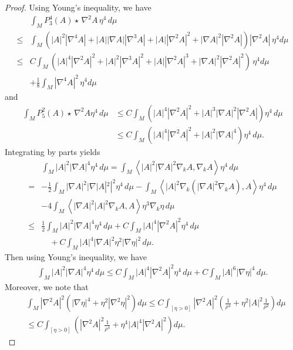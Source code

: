 \documentclass{amsart}
\theoremstyle{definition}
\numberwithin{equation}{section}
\begin{document}
\begin{proof}
Using Young's inequality, we have
\begin{align}\label{4.5.5}
  &\int_{M}     P_{3}^{4}(A)\star \,  \nabla^{2} A\, \eta ^{4}\, d\mu \\
   \leq &\int_{M} (|A|^2|\nabla^4 A| +|A| |\nabla A| |\nabla^3 A|  +|A||\nabla^2A|^2+|\nabla A|^2|\nabla^2A|)|\nabla^2A| \,\eta
   ^{4}d\mu\nonumber\\
  \leq & C \int_{M}(|A|^4|\nabla^2A|^2+|A|^2|\nabla^3 A|^2 +|A||\nabla^2A|^3 +|\nabla A|^2|\nabla^2A|^2 )\,\eta
  ^{4}d\mu\nonumber\\
  & +\frac 1 8\int_{M} |\nabla^4 A|^2\,\eta ^{4}d\mu\nonumber
\end{align}
and
\begin{align}\label{4.5.6}
  \int_{M}     P_{5}^{2}(A)\star \, \nabla^{2} A \eta^4\, d\mu &\leq C \int_{M} (|A|^4|\nabla^2 A|^2+ |A|^3|\nabla  A|^2|\nabla^2A| ) \eta^4\,
  d\mu\\
  &\leq C \int_{M} (|A|^4|\nabla^2 A|^2+ |A|^2|\nabla  A|^4  ) \eta^4\, d\mu.\nonumber
\end{align}
 Integrating by parts yields
\begin{align*}
 & \int_{M}     |A|^2|\nabla  A|^4    \eta^4\, d\mu= \int_{M}    \left < |A|^2|\nabla  A|^2 \nabla_k A, \nabla_k A\right >    \eta^4\, d\mu
  \\
  =&-\frac 12 \int_{M}    |\nabla  A|^2 |\nabla  |A|^2 |^2   \eta^4\, d\mu - \int_{M}   \left <|A|^2 \nabla_k (|\nabla  A|^2 \nabla_k A ),   A\right >   \eta^4\, d\mu\\
  &- 4\int_{M}   \left <|\nabla  A|^2  |A|^2 \nabla_k A,
    A\right >   \eta^3 \nabla_k  \eta \, d\mu \\
   \leq&\frac  1 2 \int_{M}     |A|^2|\nabla  A|^4    \eta^4\, d\mu + C \int_{M}   |A|^4  |\nabla^2 A|^2  \eta^4\, d\mu\\
  & \quad + C\int_{M}    |A|^4  |\nabla A|^2   \eta^2 |\nabla  \eta |^2\, d\mu.
\end{align*}
Then using Young's inequality, we have
\begin{align}\label{4.5.7}
\int_{M}     |A|^2|\nabla  A|^4   \eta^4\, d\mu\leq  C \int_{M}   |A|^4  |\nabla^2 A|^2  \eta^4\, d\mu
+C\int_{M}    |A|^6   |\nabla  \eta |^4\, d\mu.
\end{align}
Moreover, we
note that
\begin{align*}
 &\int_{M} \left| \nabla^{2} A \right|^{2}  \left( \left| \nabla \eta\right|^{4} + \eta^2 \left| \nabla^{2} \eta
  \right|^{2} \right) d\mu
\leq  C\int_{\left[ \eta >0 \right]} \left| \nabla^{2} A \right|^{2}  \left( \frac 1  {\rho^4}  + \eta^2 |A|^2 \frac 1{\rho^2}\right) d\mu\\
  & \leq C \int_{\left[ \eta >0 \right]}  \left( \left| \nabla^{2} A \right|^{2}  \frac 1  {\rho^4}  + \eta^4 |A|^4 |\nabla^2A|^2\right ) d\mu
  .
\end{align*}


\end{proof}
\end{document}

